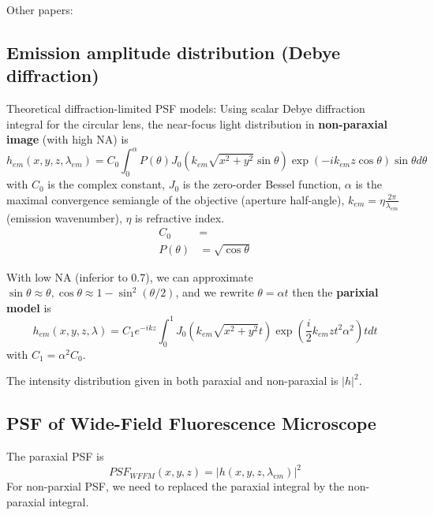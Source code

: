 Other papers: \citep{ohkubo2006}

\subsection{Emission amplitude distribution (Debye diffraction)}

Theoretical diffraction-limited PSF models: Using scalar Debye diffraction
integral for the circular lens, the near-focus light distribution in
{\bf non-paraxial image } (with high NA) is
\begin{equation}
h_{em}(x,y,z, \lambda_{em}) = C_0 \int_0^\alpha P(\theta)J_0\left( k_{em}
\sqrt{x^2+y^2} \sin \theta \right) \exp(-i k_{em} z \cos\theta) \sin\theta
d\theta
\end{equation}
with $C_0$ is the complex constant, $J_0$ is the zero-order Bessel function,
$\alpha$ is the maximal convergence semiangle of the objective (aperture
half-angle), $k_{em} = \eta\frac{2\pi}{\lambda_{em}}$ (emission wavenumber),
$\eta$ is refractive index.
\begin{equation}
\begin{split}
C_0 &= \\
P(\theta) &= \sqrt{\cos{\theta}}
\end{split} 
\end{equation}

With low NA (inferior to 0.7), we can approximate $\sin\theta \approx
\theta, \cos\theta\approx 1- \sin^2(\theta/2)$, and we rewrite $\theta = \alpha
t$ then the {\bf parixial model } is
\begin{equation}
h_{em}(x,y,z, \lambda) = C_1 e^{-ikz} \int_0^1 J_0\left( k_{em}
\sqrt{x^2+y^2} t \right) \exp(\frac{i}{2} k_{em} z t^2 \alpha^2 ) t dt
\end{equation} 
with $C_1 =\alpha^2 C_0$.

The intensity distribution given in both paraxial and non-paraxial is $|h|^2$.

\subsection{PSF of Wide-Field Fluorescence Microscope}
\label{sec:PSF_WFFM}

The paraxial PSF is
\begin{equation}
PSF_{WFFM} (x,y,z) = |h(x,y,z,\lambda_{em})|^2
\end{equation}
For non-parxial PSF, we need to replaced the paraxial integral by the
non-paraxial integral.

